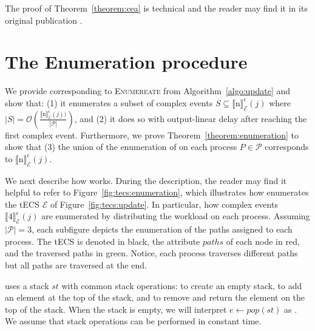The proof of Theorem~\ref{theorem:cea} is technical and the reader may find it in its original publication \cite{core}.

\section{The Enumeration procedure}\label{sec:enumeration}

We provide  corresponding to \textsc{Enumereate} from Algorithm~\ref{algo:update} and show that: (1) it enumerates a subset of complex events $S \subseteq {\llbracket \text{n} \rrbracket}^{\epsilon}_{\mathcal{E}}(j)$ where $|S| = \mathcal{O}(\frac{{\llbracket \text{n} \rrbracket}^{\epsilon}_{\mathcal{E}}(j))}{|\mathcal{P}|})$, and (2) it does so with output-linear delay after reaching the first complex event. Furthermore, we prove Theorem~\ref{theorem:enumeration} to show that (3) the union of the enumeration of  on each process $P \in \mathcal{P}$ corresponds to ${\llbracket \text{n} \rrbracket}^{\epsilon}_{\mathcal{E}}(j)$.

We next describe how  works. During the description, the reader may find it helpful to refer to Figure~\ref{fig:tecs:enumeration}, which illustrates how  enumerates the tECS $\mathcal{E}$ of Figure~\ref{fig:tecs:update}. In particular, how complex events ${\llbracket \text{4} \rrbracket}^{\epsilon}_{\mathcal{E}}(j)$ are enumerated by distributing the workload on each process. Assuming $|\mathcal{P}| = 3$, each subfigure depicts the enumeration of the paths assigned to each process. The tECS is denoted in black, the attribute $paths$ of each node in red, and the traversed paths in green. Notice, each process traverses different paths but all paths are traversed at the end.

 uses a stack $st$ with common stack operations:  to create an empty stack,  to add an element  at the top of the stack, and  to remove and return the element on the top of the stack. When the stack is empty, we will interpret $e \leftarrow pop(st)$ as . We assume that stack operations can be performed in constant time.

